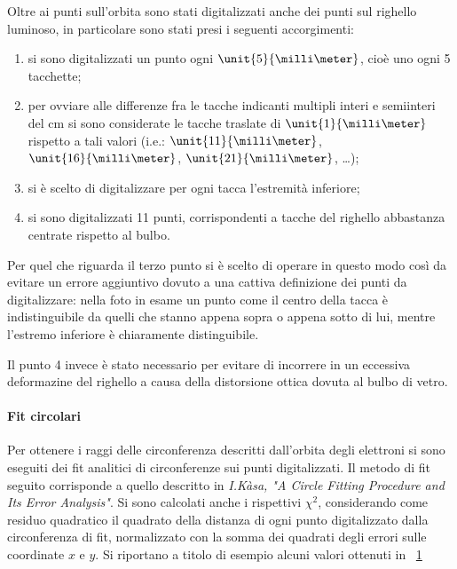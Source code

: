 \documentclass[10pt,a4paper]{article}
\begin{document}
Oltre ai punti sull'orbita sono stati digitalizzati anche dei punti sul righello luminoso, in particolare sono stati presi i seguenti accorgimenti:
\begin{enumerate}
	\item si sono digitalizzati un punto ogni $\unit{5}{\milli\meter}$, cioè uno ogni 5 tacchette;
	\item per ovviare alle differenze fra le tacche indicanti multipli interi e semiinteri del cm si sono considerate le tacche traslate di $\unit{1}{\milli\meter}$ rispetto a tali valori (i.e.: $\unit{11}{\milli\meter}$, $\unit{16}{\milli\meter}$, $\unit{21}{\milli\meter}$, \dots);
	\item si è scelto di digitalizzare per ogni tacca l'estremità inferiore;
	\item si sono digitalizzati 11 punti, corrispondenti a tacche del righello abbastanza centrate rispetto al bulbo.
\end{enumerate}

Per quel che riguarda il terzo punto si è scelto di operare in questo modo così da evitare un errore aggiuntivo dovuto a una cattiva definizione dei punti da digitalizzare: nella foto in esame un punto come il centro della tacca è indistinguibile da quelli che stanno appena sopra o appena sotto di lui, mentre l'estremo inferiore è chiaramente distinguibile.

Il punto 4 invece è stato necessario per evitare di incorrere in un eccessiva deformazine del righello a causa della distorsione ottica dovuta al bulbo di vetro.

\paragraph{Fit circolari} Per ottenere i raggi delle circonferenza descritti dall'orbita degli elettroni si sono eseguiti dei fit analitici di circonferenze sui punti digitalizzati. Il metodo di fit seguito corrisponde a quello descritto in \emph{I.Kàsa, "A Circle Fitting Procedure and Its Error Analysis"}.
Si sono calcolati anche i rispettivi $\chi^2$, considerando come residuo quadratico il quadrato della distanza di ogni punto digitalizzato dalla circonferenza di fit, normalizzato con la somma dei quadrati degli errori sulle coordinate $x$ e $y$.
Si riportano a titolo di esempio alcuni valori ottenuti in \tablename{~\ref{tab:rpchi2}}

\begin{figure}[H]
	\centering
	\resizebox{0.3\textwidth}{!}{
		}
	\label{tab:rpchi2}
\end{figure}
\end{document}
